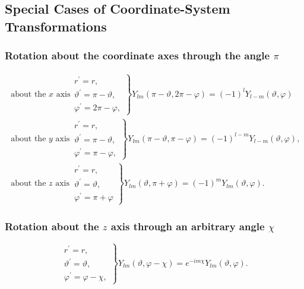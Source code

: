 \subsection{Special Cases of Coordinate-System Transformations}\label{sec:5.5.4}
\subsubsection{Rotation about the coordinate axes through the angle $\pi$}
\begin{align}
\text { about the } x \text { axis } & \left.\begin{array}{l}
r^{\prime}=r, \\
\vartheta^{\prime}=\pi-\vartheta, \\
\varphi^{\prime}=2 \pi-\varphi,
\end{array}\right\} Y_{l m}(\pi-\vartheta, 2 \pi-\varphi)=(-1)^{l} Y_{l-m}(\vartheta, \varphi)  \label{eq:5:5:6}\\
\text { about the } y \text { axis } & \left.\begin{array}{l}
r^{\prime}=r, \\
\vartheta^{\prime}=\pi-\vartheta, \\
\varphi^{\prime}=\pi-\varphi,
\end{array}\right\} Y_{l m}(\pi-\vartheta, \pi-\varphi)=(-1)^{l-m} Y_{l-m}(\vartheta, \varphi),  \label{eq:5:5:7}\\
\text { about the } z \text { axis } & \left.\begin{array}{l}
r^{\prime}=r, \\
\vartheta^{\prime}=\vartheta, \\
\varphi^{\prime}=\pi+\varphi
\end{array}\right\} Y_{l m}(\vartheta, \pi+\varphi)=(-1)^{m} Y_{l m}(\vartheta, \varphi) . \label{eq:5:5:8}
\end{align}
\subsubsection{Rotation about the $z$ axis through an arbitrary angle $\chi$}
\begin{equation}
\left.\begin{array}{l}
r^{\prime}=r,  \label{eq:5:5:9}\\
\vartheta^{\prime}=\vartheta, \\
\varphi^{\prime}=\varphi-\chi,
\end{array}\right\} Y_{l m}(\vartheta, \varphi-\chi)=e^{-i m \chi} Y_{l m}(\vartheta, \varphi) .
\end{equation}
